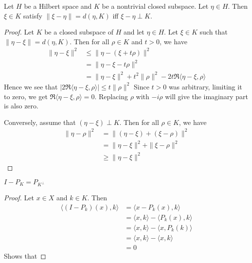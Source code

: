 
\begin{lemma}
  Let $H$ be a Hilbert space and $K$ be a nontrivial closed subspace.
  Let $\eta \in H$. Then $\xi \in K$ satisfy $\|\xi - \eta\| = d(\eta, K)$ iff
  $\xi - \eta \perp K$.
\end{lemma}
\begin{proof}
  Let $K$ be a closed subspace of $H$ and let $\eta \in H$. Let $\xi
  \in K$ such that $\|\eta - \xi\|= d(\eta, K)$. Then for all $\rho
  \in K$ and $t > 0$, we have
  \begin{align*}
    \|\eta - \xi\|^2 &\le \|\eta - (\xi + t\rho)\|^2  \\
    & = \| \eta - \xi -  t\rho\|^2 \\
    & = \|\eta - \xi\|^2 + t^2\|\rho\|^2 - 2t\Re \langle \eta - \xi ,
    \rho \rangle
  \end{align*}
  Hence we see that $|2\Re \langle \eta - \xi , \rho \rangle| \le t\|\rho\|^2$
  Since $t>0$ was arbitrary, limiting it to zero, we get $\Re \langle
  \eta - \xi ,  \rho \rangle = 0$. Replacing $\rho$ with $-i \rho$
  will give the imaginary part is also zero.

  Conversely, assume that $(\eta - \xi) \perp K$. Then  for all $\rho
  \in K$, we have
  \begin{align*}
    \|\eta - \rho\|^2 &= \|(\eta - \xi) + (\xi - \rho)\|^2 \\
    & = \|\eta - \xi\|^2 + \|\xi - \rho\|^2 \\
    & \ge \|\eta  - \xi\|^2
  \end{align*}
\end{proof}

\begin{proposition}
  $I-P_K = P_{K^\perp}$
\end{proposition}
\begin{proof}
  Let $x \in X$ and $k \in K$. Then
  \begin{align*}
    \langle (I - P_k)(x), k \rangle &= \langle  x - P_k(x) , k \rangle \\
    &= \langle  x , k \rangle - \langle P_k(x) ,  k \rangle  \\
    &= \langle x , k \rangle  - \langle x , P_k(k) \rangle \\
    &= \langle x , k \rangle  - \langle  x , k \rangle  \\
    &= 0
  \end{align*}
  Shows that
\end{proof}

